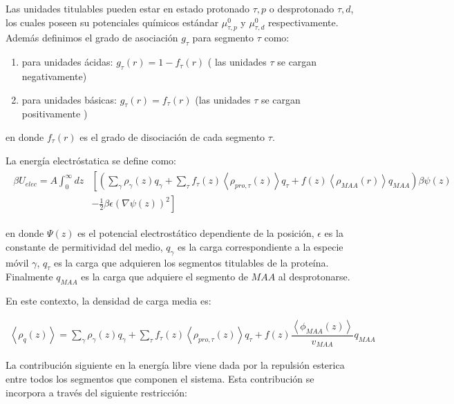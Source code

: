 Las unidades titulables pueden estar en estado protonado $\tau, p$ o desprotonado $\tau, d$, los cuales poseen su potenciales qu\'imicos est\'andar $\mu^0_{\tau,p}$ y $\mu^0_{\tau,d}$ respectivamente. 
Adem\'as definimos el grado de asociaci\'on $g_\tau$ para segmento $\tau$ como:


\begin{enumerate}
	\item para unidades \'acidas: $g_\tau(r) = 1-f_\tau(r)$ ( las unidades $\tau$ se cargan negativamente)
	\item para unidades b\'asicas: $g_\tau(r) = f_\tau(r)$ (las  unidades $\tau$ se cargan positivamente  )
\end{enumerate}
en donde  $f_\tau(r)$ es el grado de disociaci\'on de cada segmento $\tau$.

La energ\'ia electr\'ostatica se define como:
\begin{align}
	\begin{aligned}
		\beta U_{elec}= A\int_0^\infty dz&\left[\left(\sum_{\gamma } {\rho_\gamma(z) q_\gamma + \sum_\tau{f_\tau(z) \left<\rho_{pro,\tau}(z)\right> q_\tau} +  f(z)\left<\rho_{MAA}(r)\right>q_{MAA}}\right)\beta\psi(z) \right. \\ &\left.-\frac{1}{2}\beta\epsilon(\nabla\psi(z))^2 \right]
	\end{aligned}
\end{align} 

\noindent en donde $\Psi(z)$ es el potencial electrost\'atico dependiente de la posici\'on, $\epsilon$ es la constante de permitividad del medio, $q_\gamma$ es la carga correspondiente a la especie m\'ovil $\gamma$, $q_\tau$ es la carga que adquieren los segmentos titulables de la prote\'ina. Finalmente $q_{MAA}$ es la carga que adquiere el segmento de $MAA$ al desprotonarse.


En este contexto, la densidad de carga media es:

\begin{align}
	\left<\rho_q(z)\right> = \sum_{\gamma } {\rho_\gamma(z) q_\gamma + \sum_\tau{f_\tau(z) \left<\rho_{pro,\tau}(z)\right> q_\tau} +  f(z)\dfrac{\left<\phi_{MAA}(z)\right>}{v_{MAA}}q_{MAA}}
	\label{eq:film:rho_charge}
\end{align}

La contribuci\'on siguiente en la energ\'ia libre viene dada por la repulsi\'on esterica entre  todos los segmentos que componen  el sistema. Esta contribuci\'on se incorpora a trav\'es del siguiente restricci\'on:  


